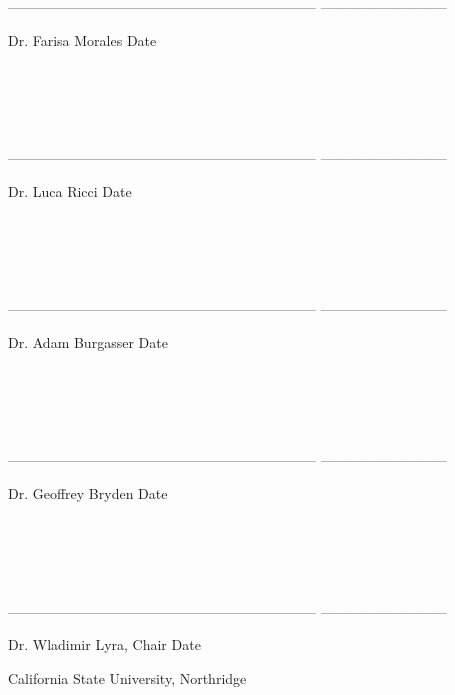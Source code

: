 \documentclass[onecolumn]{report}
\begin{document}
------------------------------------------------------------------ \hfill ---------------------------

Dr. Farisa Morales \hfill Date \hspace{75pt} \\~\\~\\~\\~\\~\\

------------------------------------------------------------------ \hfill ---------------------------

Dr. Luca Ricci \hfill Date \hspace{75pt} \\~\\~\\~\\~\\~\\

------------------------------------------------------------------ \hfill ---------------------------

Dr. Adam Burgasser \hfill Date \hspace{75pt} \\~\\~\\~\\~\\~\\

------------------------------------------------------------------ \hfill ---------------------------

Dr. Geoffrey Bryden \hfill Date \hspace{75pt} \\~\\~\\~\\~\\~\\

------------------------------------------------------------------ \hfill ---------------------------

Dr. Wladimir Lyra, Chair \hfill Date \hspace{75pt}

\vfill
\begin{center}
California State University, Northridge
\end{center}

\doublespacing
\end{document}
